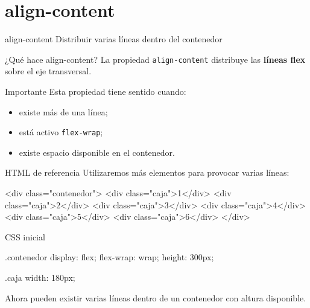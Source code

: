 \documentclass[aspectratio=169,11.5pt]{beamer}
\begin{document}

    \section{align-content}

    \SectionSlide
    {align-content}
    {Distribuir varias líneas dentro del contenedor}

    \begin{frame}{¿Qué hace align-content?}
        La propiedad \texttt{align-content}
        distribuye las \textbf{líneas flex}
        sobre el eje transversal.

        \begin{block}{Importante}
            Esta propiedad tiene sentido cuando:

            \begin{itemize}
                \item existe más de una línea;
                \item está activo \texttt{flex-wrap};
                \item existe espacio disponible en el contenedor.
            \end{itemize}
        \end{block}
    \end{frame}

    \begin{frame}[fragile]{HTML de referencia}
        Utilizaremos más elementos para provocar
        varias líneas:

        \begin{htmlcodedark}
        <div class="contenedor">
            <div class="caja">1</div>
            <div class="caja">2</div>
            <div class="caja">3</div>
            <div class="caja">4</div>
            <div class="caja">5</div>
            <div class="caja">6</div>
        </div>
        \end{htmlcodedark}
    \end{frame}

    \begin{frame}[fragile]{CSS inicial}
        \begin{csscodedark}
            .contenedor {
                display: flex;
                flex-wrap: wrap;
                height: 300px;
            }

            .caja {
                width: 180px;
            }
        \end{csscodedark}

        Ahora pueden existir varias líneas dentro
        de un contenedor con altura disponible.
    \end{frame}
\end{document}
